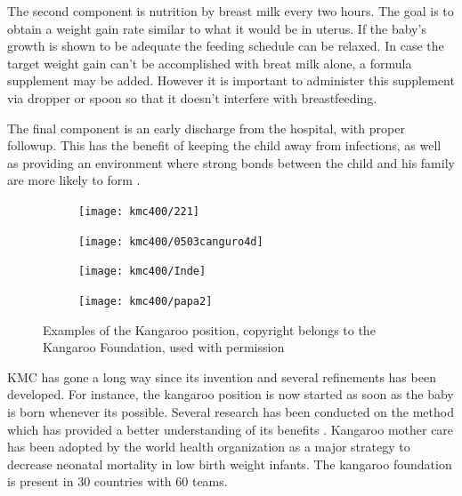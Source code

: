 The second component is nutrition by breast milk every two hours. The goal is to obtain a weight gain rate similar to what it would be in uterus. If the baby's growth is shown to be adequate the feeding schedule can be relaxed. In case the target weight gain can't be accomplished with breat milk alone, a formula supplement may be added. However it is important to administer this supplement via dropper or spoon so that it doesn't interfere with breastfeeding.

The final component is an early discharge from the hospital, with proper followup. This has the benefit of keeping the child away from infections, as well as providing an environment where strong bonds between the child and his family are more likely to form \autocite{charpak_kangaroo_2005}. 

\begin{figure}
    \centering
    \begin{subfigure}{0.45\textwidth}
        \texttt{[image: kmc400/221]}
    \end{subfigure}
    \begin{subfigure}{0.45\textwidth}
        \texttt{[image: kmc400/0503canguro4d]}
    \end{subfigure}
		    \begin{subfigure}{0.45\textwidth}
        \texttt{[image: kmc400/Inde]}
    \end{subfigure}
		    \begin{subfigure}{0.45\textwidth}
        \texttt{[image: kmc400/papa2]}
    \end{subfigure}
    \caption{Examples of the Kangaroo position, copyright belongs to the Kangaroo Foundation, used with permission}\label{fig_kmc_position}
\end{figure}

KMC has gone a long way since its invention \autocite{charpak_kmc_2011} and several refinements has been developed. For instance, the kangaroo position is now started as soon as the baby is born whenever its possible. Several research has been conducted on the method which has provided a better understanding of its benefits \autocite{the_cochrane_collaboration_kangaroo_2014}.
Kangaroo mother care has been adopted by the world health organization as a major strategy to decrease neonatal mortality in low birth weight infants. The kangaroo foundation is present in 30 countries with 60 teams. 



